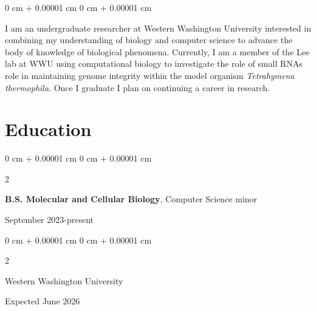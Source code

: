 \documentclass[10pt, article]{article}
\newenvironment{onecolentry}{
    \begin{adjustwidth}{
        0 cm + 0.00001 cm
    }{
        0 cm + 0.00001 cm
    }
}{
    \end{adjustwidth}
} %
\newenvironment{twocolentry}[2][]{
    \onecolentry
    \def\secondColumn{#2}
    \setcolumnwidth{\fill, 4.5 cm}
    \begin{paracol}{2}
}{
    \switchcolumn \raggedleft \secondColumn
    \end{paracol}
    \endonecolentry
} %
\begin{document}
        \begin{onecolentry}
          I am an undergraduate researcher at Western Washington University interested in combining my understanding of biology and computer science to advance the body of knowledge of biological phenomena.
          Currently, I am a member of the Lee lab at WWU
          using computational biology to investigate the role of small RNAs role in maintaining genome integrity within the model organism \textit{Tetrahymena thermophila}. 
           Once I graduate I plan on continuing a career in research. 
        \end{onecolentry}






    \section{Education}




        \begin{twocolentry}{
            September 2023-present}
          \textbf{B.S. Molecular and Cellular Biology}, Computer Science minor 
        \end{twocolentry}
        \begin{twocolentry}{
            Expected June 2026
        }
            Western Washington University 

        \end{twocolentry}
\end{document}
